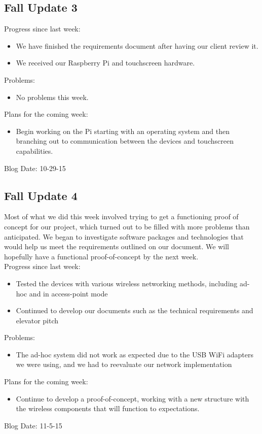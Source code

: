 \subsection{Fall Update 3}
Progress since last week:
\begin{itemize}
\item We have finished the requirements document after having our client review it.
\item We received our Raspberry Pi and touchscreen hardware.
\end{itemize}
Problems:
\begin{itemize}
\item No problems this week.
\end{itemize}
Plans for the coming week: 
\begin{itemize}
\item Begin working on the Pi starting with an operating system and then branching out to communication between the devices and touchscreen capabilities.
\end{itemize}
Blog Date: 10-29-15


\subsection{Fall Update 4}
Most of what we did this week involved trying to get a functioning proof of concept for our project, which turned out to be filled with more problems than anticipated. We began to investigate software packages and technologies that would help us meet the requirements outlined on our document. We will hopefully have a functional proof-of-concept by the next week.\\
Progress since last week:
\begin{itemize}
\item Tested the devices with various wireless networking methods, including ad-hoc and in access-point mode
\item Continued to develop our documents such as the technical requirements and elevator pitch
\end{itemize}
Problems:
\begin{itemize}
\item The ad-hoc system did not work as expected due to the USB WiFi adapters we were using, and we had to reevaluate​ our network implementation
\end{itemize}
Plans for the coming week: 
\begin{itemize}
\item Continue to develop a proof-of-concept, working with a new structure with the wireless components that will function to expectations.
\end{itemize}
Blog Date: 11-5-15

